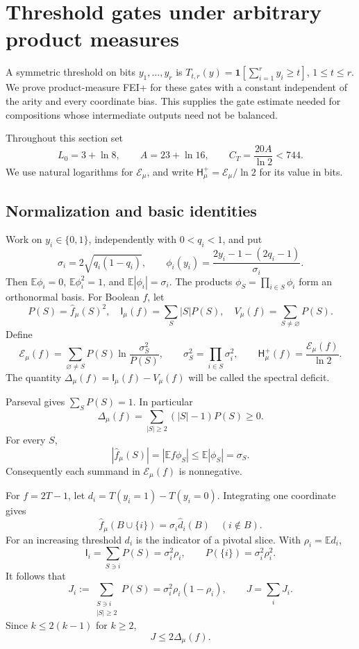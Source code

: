 \documentclass[11pt]{amsart}
\theoremstyle{definition}
\theoremstyle{remark}
\newcommand{\HH}{\mathsf H}
\newcommand{\I}{\mathsf I}
\begin{document}
\section{Threshold gates under arbitrary product measures}
\label{bias:section}

A symmetric threshold on bits \(y_1,\ldots,y_r\) is
\(T_{t,r}(y)=\mathbf1[\sum_{i=1}^r y_i\ge t]\), \(1\le t\le r\).
We prove product-measure FEI+ for these gates with a constant independent
of the arity and every coordinate bias. This supplies the gate estimate
needed for compositions whose intermediate outputs need not be balanced.

Throughout this section set
\[
 L_0=3+\ln8,\qquad
 A=23+\ln16,\qquad C_T=\frac{20A}{\ln2}<744.
\]
We use natural logarithms for \(\mathcal E_\mu\), and write
\(\HH_\mu^+=\mathcal E_\mu/\ln2\) for its value in bits.

\subsection{Normalization and basic identities}\label{bias:normalization}

Work on \(y_i\in\{0,1\}\), independently with \(0<q_i<1\), and put \[
 \sigma_i=2\sqrt{q_i(1-q_i)},\qquad
 \phi_i(y_i)=\frac{2y_i-1-(2q_i-1)}{\sigma_i}.
\] Then \(\mathbb E\phi_i=0\), \(\mathbb E\phi_i^2=1\), and \(\mathbb E|\phi_i|=\sigma_i\). The products \(\phi_S=\prod_{i\in S}\phi_i\) form an orthonormal basis. For Boolean \(f\), let \[
 P(S)=\widehat f_\mu(S)^2,\quad
 \I_\mu(f)=\sum_S|S|P(S),\quad
 V_\mu(f)=\sum_{S\ne\varnothing}P(S).
\] Define \[
 \mathcal E_\mu(f)=
 \sum_{\varnothing\ne S}P(S)\ln\frac{\sigma_S^2}{P(S)},
 \qquad \sigma_S^2=\prod_{i\in S}\sigma_i^2,\qquad
 \HH_\mu^+(f)=\frac{\mathcal E_\mu(f)}{\ln2}.
\] The quantity \(\Delta_\mu(f)=\I_\mu(f)-V_\mu(f)\) will be called the spectral deficit.

Parseval gives \(\sum_SP(S)=1\). In particular \[
 \Delta_\mu(f)=\sum_{|S|\ge2}(|S|-1)P(S)\ge0.
\] For every \(S\), \[
 |\widehat f_\mu(S)|
   =|\mathbb E f\phi_S|
   \le\mathbb E|\phi_S|=\sigma_S.
\] Consequently each summand in \(\mathcal E_\mu(f)\) is nonnegative.

For \(f=2T-1\), let \(d_i=T(y_i=1)-T(y_i=0)\). Integrating one coordinate gives \[
 \widehat f_\mu(B\cup\{i\})=\sigma_i\widehat d_i(B)
 \quad (i\notin B).
\] For an increasing threshold \(d_i\) is the indicator of a pivotal slice. With \(\rho_i=\mathbb E d_i\), \[
 \I_i=\sum_{S\ni i}P(S)=\sigma_i^2\rho_i,\qquad
 P(\{i\})=\sigma_i^2\rho_i^2.
\] It follows that \[
 J_i:=\sum_{\substack{S\ni i\\|S|\ge2}}P(S)
       =\sigma_i^2\rho_i(1-\rho_i),\qquad
 J=\sum_iJ_i.
\] Since \(k\le2(k-1)\) for \(k\ge2\), \[
 J\le2\Delta_\mu(f).
\]
\end{document}
